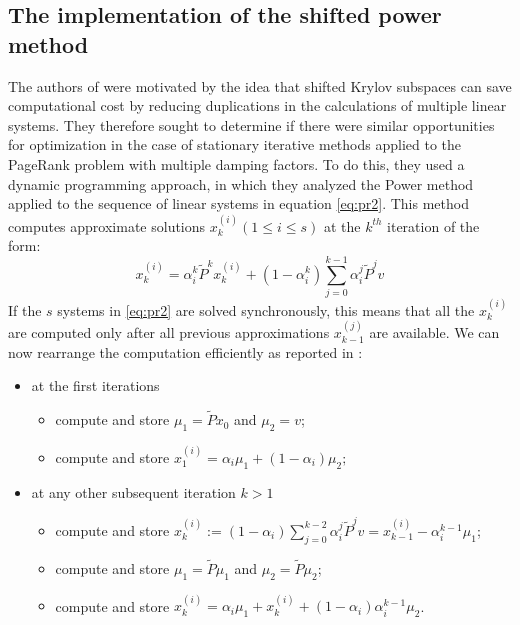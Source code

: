 \subsection{The implementation of the shifted power method}
The authors of \cite{SHEN2022126799} were motivated by the idea that shifted Krylov subspaces can save computational cost by reducing duplications in the calculations of multiple linear systems. They therefore sought to determine if there were similar opportunities for optimization in the case of stationary iterative methods applied to the PageRank problem with multiple damping factors. To do this, they used a dynamic programming approach, in which they analyzed the Power method applied to the sequence of linear systems in equation \ref{eq:pr2}. This method computes approximate solutions $x_k^{(i)} (1 \leq i \leq s)$ at the $k^{th}$ iteration of the form:
\begin{equation}
    x_k^{(i)} = \alpha_i^k \tilde P^k x_k^{(i)} + (1 - \alpha_i^k) \sum_{j=0}^{k-1} \alpha_i^j \tilde P^j v
\end{equation}
If the $s$ systems in \ref{eq:pr2} are solved synchronously, this means that all the $x^{(i)}_k$ are computed only after all previous approximations $x^{(j)}_{k-1}$ are available. We can now rearrange the computation efficiently as reported in \cite{SHEN2022126799}:
\begin{itemize}
    \item at the first iterations
        \begin{itemize}
            \item compute and store $\mu_1 = \tilde P x_0$ and $\mu_2 = v$;
            \item compute and store $x_1^{(i)} = \alpha_i \mu_1 + (1-\alpha_i)\mu_2;$
        \end{itemize}
    \item at any other subsequent iteration $k>1$
        \begin{itemize}
            \item compute and store $ x_k^{(i)} := (1-\alpha_i)\sum_{j=0}^{k-2} \alpha_i^j \tilde P^j v= x_{k-1}^{(i)} - \alpha_i^{k-1} \mu_1$;
            \item compute and store $\mu_1 = \tilde P \mu_1$ and $\mu_2 = \tilde P \mu_2$;
            \item compute and store $x_k^{(i)} = \alpha_i \mu_1 + x_k^{(i)} + (1-\alpha_i)\alpha^{k-1}_i \mu_2$.
        \end{itemize}
\end{itemize}
